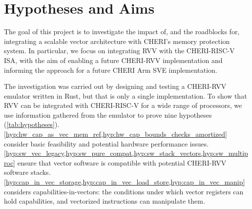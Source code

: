 \documentclass[../thesis]{subfiles}
\begin{document}


\section{Hypotheses and Aims}
The goal of this project is to investigate the impact of, and the roadblocks for, integrating a scalable vector architecture with CHERI's memory protection system.
In particular, we focus on integrating RVV with the CHERI-RISC-V ISA, with the aim of enabling a future CHERI-RVV implementation and informing the approach for a future CHERI Arm SVE implementation.

The investigation was carried out by designing and testing a CHERI-RVV emulator written in Rust, but that is only a single implementation.
To show that RVV can be integrated with CHERI-RISC-V for a wide range of processors, we use information gathered from the emulator to prove nine hypotheses (\cref{tab:hypotheses}).
\cref{hyp:hw_cap_as_vec_mem_ref,hyp:hw_cap_bounds_checks_amortized} consider basic feasibility and potential hardware performance issues.
\cref{hyp:sw_vec_legacy,hyp:sw_pure_compat,hyp:sw_stack_vectors,hyp:sw_multiproc} ensure that vector software is compatible with potential CHERI-RVV software stacks.
\cref{hyp:cap_in_vec_storage,hyp:cap_in_vec_load_store,hyp:cap_in_vec_manip} considers capabilities-in-vectors: the conditions under which vector registers can hold capabilities, and vectorized instructions can manipulate them.
\end{document}
